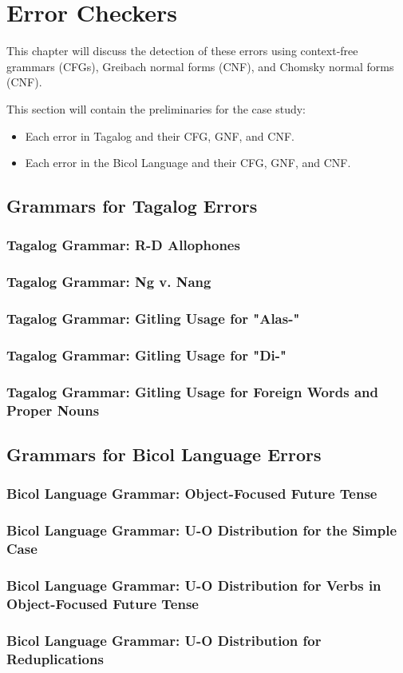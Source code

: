 \chapter{Error Checkers}
This chapter will discuss the detection of these errors using context-free grammars (CFGs), Greibach normal forms (CNF), and Chomsky normal forms (CNF).

{\color{blue}
This section will contain the preliminaries for the case study:

\begin{itemize}
    \item Each error in Tagalog and their CFG, GNF, and CNF.
    \item Each error in the Bicol Language and their CFG, GNF, and CNF.
\end{itemize}
}

\section{Grammars for Tagalog Errors}
\subsection{Tagalog Grammar: R-D Allophones}
\subsection{Tagalog Grammar: Ng v. Nang}
\subsection{Tagalog Grammar: Gitling Usage for "Alas-"}
\subsection{Tagalog Grammar: Gitling Usage for "Di-"}
\subsection{Tagalog Grammar: Gitling Usage for Foreign Words and Proper Nouns}


\section{Grammars for Bicol Language Errors}
\subsection{Bicol Language Grammar: Object-Focused Future Tense}
\subsection{Bicol Language Grammar: U-O Distribution for the Simple Case}
\subsection{Bicol Language Grammar: U-O Distribution for Verbs in Object-Focused Future Tense}
\subsection{Bicol Language Grammar: U-O Distribution for Reduplications}
